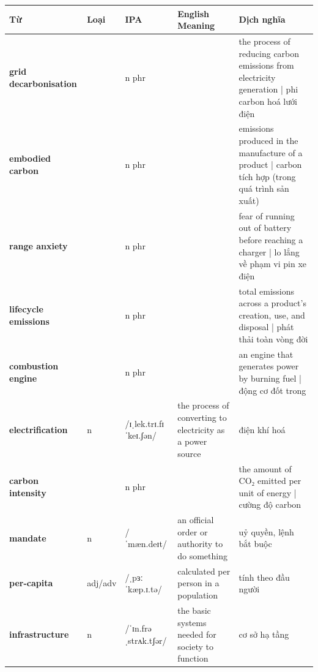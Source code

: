 \vspace{0.8em}
\begin{center}
\renewcommand{\arraystretch}{1.65}
\begin{tabularx}{\textwidth}{|V{0.22\textwidth}|C{0.07\textwidth}|I{0.20\textwidth}|Y|V{0.18\textwidth}|}
\hline
{}
\textbf{Từ} & \textbf{Loại} & \textbf{IPA} & \textbf{English Meaning} & \textbf{Dịch nghĩa} \\
\hline
\textbf{grid decarbonisation} & & n phr & & the process of reducing carbon emissions from electricity generation | phi carbon hoá lưới điện \\ \hline
\textbf{embodied carbon} & & n phr & & emissions produced in the manufacture of a product | carbon tích hợp (trong quá trình sản xuất) \\ \hline
\textbf{range anxiety} & & n phr & & fear of running out of battery before reaching a charger | lo lắng về phạm vi pin xe điện \\ \hline
\textbf{lifecycle emissions} & & n phr & & total emissions across a product's creation, use, and disposal | phát thải toàn vòng đời \\ \hline
\textbf{combustion engine} & & n phr & & an engine that generates power by burning fuel | động cơ đốt trong \\ \hline
\textbf{electrification} & n & /ɪˌlek.trɪ.fɪˈkeɪ.ʃən/ & the process of converting to electricity as a power source & điện khí hoá \\ \hline
\textbf{carbon intensity} & & n phr & & the amount of CO₂ emitted per unit of energy | cường độ carbon \\ \hline
\textbf{mandate} & n & /ˈmæn.deɪt/ & an official order or authority to do something & uỷ quyền, lệnh bắt buộc \\ \hline
\textbf{per-capita} & adj/adv & /ˌpɜː ˈkæp.ɪ.tə/ & calculated per person in a population & tính theo đầu người \\ \hline
\textbf{infrastructure} & n & /ˈɪn.frəˌstrʌk.tʃər/ & the basic systems needed for society to function & cơ sở hạ tầng \\ \hline
\end{tabularx}
\end{center}

\newpage

